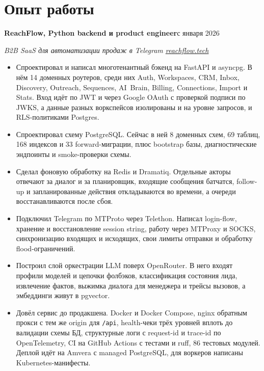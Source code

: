 \documentclass[10pt,a4paper]{article}
\newcommand{\role}[2]{\textbf{#1}\hfill #2\par}
\begin{document}
\section{Опыт работы}

\role{ReachFlow, Python backend и product engineer}{с января 2026}
\textit{B2B SaaS для автоматизации продаж в Telegram \textperiodcentered{} \href{https://reachflow.tech}{reachflow.tech}}
\begin{itemize}
  \item Спроектировал и написал многотенантный бэкенд на FastAPI и asyncpg. В нём 14 доменных роутеров, среди них
        Auth, Workspaces, CRM, Inbox, Discovery, Outreach, Sequences, AI~Brain, Billing, Connections, Import и Stats.
        Вход идёт по JWT и через Google OAuth с проверкой подписи по JWKS, а данные разных воркспейсов изолированы
        и на уровне запросов, и RLS-политиками Postgres.
  \item Спроектировал схему PostgreSQL. Сейчас в ней 8 доменных схем, 69 таблиц, 168 индексов и 33 forward-миграции,
        плюс bootstrap базы, диагностические эндпоинты и smoke-проверки схемы.
  \item Сделал фоновую обработку на Redis и Dramatiq. Отдельные акторы отвечают за диалог и за планировщик, входящие
        сообщения батчатся, follow-up и запланированные действия откладываются во времени, а очереди восстанавливаются
        после сбоя.
  \item Подключил Telegram по MTProto через Telethon. Написал login-flow, хранение и восстановление session string,
        работу через MTProxy и SOCKS, синхронизацию входящих и исходящих, свои лимиты отправки и обработку
        flood-ограничений.
  \item Построил слой оркестрации LLM поверх OpenRouter. В него входят профили моделей и цепочки фолбэков, классификация
        состояния лида, извлечение фактов, выжимка диалога для менеджера и трейсы вызовов, а эмбеддинги живут
        в pgvector.
  \item Довёл сервис до продакшена. Docker и Docker Compose, nginx обратным прокси с тем же origin для \texttt{/api},
        health-чеки трёх уровней вплоть до валидации схемы БД, структурные логи с request-id и trace-id
        по OpenTelemetry, CI на GitHub Actions с тестами и ruff, 86 тестовых модулей. Деплой идёт на Amvera
        с managed PostgreSQL, для воркеров написаны Kubernetes-манифесты.
\end{itemize}
\vspace{3pt}
\end{document}
